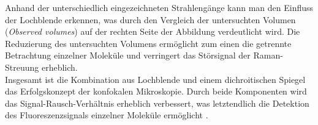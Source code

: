 Anhand der unterschiedlich eingezeichneten Strahlengänge kann man den Einfluss der Lochblende 
erkennen, was durch den Vergleich der untersuchten Volumen (\textit{Observed volumes}) auf 
der rechten Seite der Abbildung verdeutlicht wird. Die Reduzierung des untersuchten Volumens 
ermöglicht zum einen die getrennte Betrachtung einzelner Moleküle und verringert das Störsignal 
der Raman-Streuung erheblich. \\
Insgesamt ist die Kombination aus Lochblende und einem dichroitischen Spiegel das Erfolgskonzept 
der konfokalen Mikroskopie. Durch beide Komponenten wird das Signal-Rausch-Verhältnis erheblich 
verbessert, was letztendlich die Detektion des Fluoreszenzsignals einzelner Moleküle ermöglicht \cite{Prinzip}. \\

